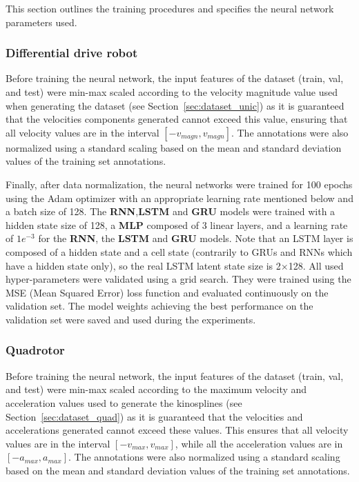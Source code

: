 This section outlines the training procedures and specifies the neural network parameters used.

\subsubsection{Differential drive robot}

Before training the neural network, the input features of the dataset (train, val, and test) were min-max scaled according to the velocity magnitude value used when generating the dataset (see Section~\ref{sec:dataset_unic}) as it is guaranteed that the velocities components generated cannot exceed this value, ensuring that all velocity values are in the interval $[-v_{magn}, v_{magn}]$.  
The annotations were also normalized using a standard scaling based on the mean and standard deviation values of the training set annotations.

Finally, after data normalization, the neural networks were trained for 100 epochs using the Adam optimizer \cite{kingma2014adam} with an appropriate learning rate mentioned below and a batch size of 128. 
The \textbf{RNN},\textbf{LSTM} and \textbf{GRU} models were trained with a hidden state size of 128, a \textbf{MLP} composed of 3 linear layers, and a learning rate of $1e^{-3}$ for the \textbf{RNN}, the \textbf{LSTM} and \textbf{GRU} models.
Note that an LSTM layer is composed of a hidden state and a cell state (contrarily to GRUs and RNNs which have a hidden state only), so the real LSTM latent state size is 2$\times$128.
All used hyper-parameters were validated using a grid search.
They were trained using the MSE (Mean Squared Error) loss function and evaluated continuously on the validation set. 
The model weights achieving the best performance on the validation set were saved and used during the experiments.

\subsubsection{Quadrotor}\label{sec:train_quad}

Before training the neural network, the input features of the dataset (train, val, and test) were min-max scaled according to the maximum velocity and acceleration values used to generate the kinosplines (see Section~\ref{sec:dataset_quad}) as it is guaranteed that the velocities and accelerations generated cannot exceed these values. 
This ensures that all velocity values are in the interval $[-v_{max}, v_{max}]$, while all the acceleration values are in $[-a_{max}, a_{max}]$. 
The annotations were also normalized using a standard scaling based on the mean and standard deviation values of the training set annotations.

